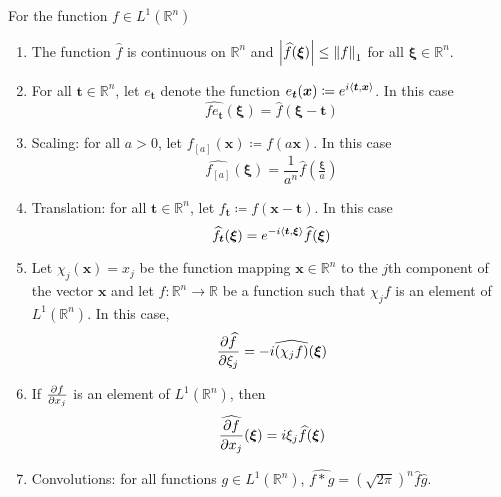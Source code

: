 \documentclass[11pt, a4paper]{article}
\newcommand{\R}{\mathbb{R}} %
\begin{document}
For the function $ f \in L^{1}(\R^n) $
\begin{enumerate}
	\item The function $ \widehat{f} $ is continuous on $ \R^n $ and $ \abs{\widehat{f}(\bm{\xi})} \leq \norm{f}_{1} $ for all $ \bm{\xi} \in \R^n$.
	
	\item For all $ \bm{t} \in \R^n $, let $ e_{\bm{t}} $ denote the function $ e_{\bm{t}}(\bm{x}) \coloneqq e^{i\expval{\bm{t}, \bm{x}}} $. In this case
	\begin{equation*}
		\widehat{f e_{\bm{t}}} (\bm{\xi}) = \widehat{f}(\bm{\xi - \bm{t}})
	\end{equation*}
	
	\item Scaling: for all $ a > 0 $, let $ f_{[a]}(\bm{x}) \coloneqq f(a\bm{x}) $. In this case
	\begin{equation*}
		\widehat{f_{[a]}} (\bm{\xi}) = \frac{1}{a^n} \widehat{f}\left(\tfrac{\bm{\xi}}{a}\right)
	\end{equation*}
	
	\item Translation: for all $ \bm{t} \in \R^n $, let $ f_{\bm{t}} \coloneqq f(\bm{x} - \bm{t})$. In this case
	\begin{equation*}
		\widehat{f_{\bm{t}}} (\bm{\xi}) = e^{-i\expval{\bm{t}, \bm{\xi}}} \widehat{f}(\bm{\xi})
	\end{equation*}
	
	\item Let $ \chi_{j}(\bm{x}) = x_j $ be the function mapping $ \bm{x} \in \R^n $ to the $ j $th component of the vector $ \bm{x} $ and let $ f : \R^n \to \R $ be a function such that $ \chi_j f $ is an element of $ L^{1}(\R^n) $. In this case,
	\begin{equation*}
		\pdv{\widehat{f}}{\xi_j} (\bm{\xi}) = - i \widehat{(\chi_j f)} (\bm{\xi})
	\end{equation*}
	
	\item If $ \pdv{f}{x_j} $ is an element of $ L^{1}(\R^n) $, then
	\begin{equation*}
		\widehat{\pdv{f}{x_j}}(\bm{\xi}) = i \xi_j \widehat{f}(\bm{\xi})
	\end{equation*}
	
	\item Convolutions: for all functions $ g \in L^{1}(\R^n) $, $ \displaystyle{\widehat{f*g}} = \left(\sqrt{2\pi}\right)^n \widehat{f}\widehat{g} $.
	

\end{enumerate}
\end{document}
